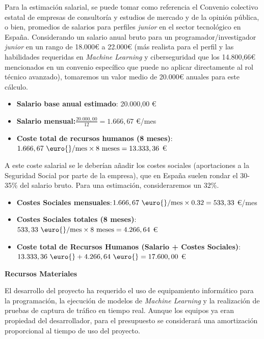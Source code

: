 Para la estimación salarial, se puede tomar como referencia el Convenio colectivo estatal de empresas de consultoría y estudios de mercado y de la opinión pública, o bien, promedios de salarios para perfiles \textit{junior} en el sector tecnológico en España. Considerando un salario anual bruto para un programador/investigador \textit{junior} en un rango de 18.000€ a 22.000€ (más realista para el perfil y las habilidades requeridas en \textit{Machine Learning} y ciberseguridad que los 14.800,66€ mencionados en un convenio específico que puede no aplicar directamente al rol técnico avanzado), tomaremos un valor medio de 20.000€ anuales para este cálculo.
\begin{itemize}

    \item\textbf{Salario base anual estimado}: 20.000,00 \euro{}
    
    \item \textbf{Salario mensual:}$\displaystyle \frac{20.000,00}{12} = 1.666,67 $ \euro{}/mes
   
    \item\textbf{Coste total de recursos humanos (8 meses)}:$\displaystyle 1.666,67 \text{ \euro{}/mes} \times 8 \text{ meses} = 13.333,36 $ \euro{}

\end{itemize}

A este coste salarial se le deberían añadir los costes sociales (aportaciones a la Seguridad Social por parte de la empresa), que en España suelen rondar el 30-35\% del salario bruto. Para una estimación, consideraremos un 32\%.
\begin{itemize}
    
    \item\textbf{Costes Sociales mensuales}:$\displaystyle 1.666,67 \text{ \euro{}/mes} \times 0.32 = 533,33 $ \euro{}/mes
    
    \item\textbf{Costes Sociales totales (8 meses)}:$\displaystyle 533,33 \text{ \euro{}/mes} \times 8 \text{ meses} = 4.266,64 $ \euro{}
    
    \item\textbf{Coste total de Recursos Humanos (Salario + Costes Sociales)}:$\displaystyle 13.333,36 \text{ \euro{}} + 4.266,64 \text{ \euro{}} = 17.600,00 $ \euro{}
    
\end{itemize}

\textbf{Recursos Materiales}
 
El desarrollo del proyecto ha requerido el uso de equipamiento informático para la programación, la ejecución de modelos de \textit{Machine Learning} y la realización de pruebas de captura de tráfico en tiempo real. Aunque los equipos ya eran propiedad del desarrollador, para el presupuesto se considerará una amortización proporcional al tiempo de uso del proyecto.

